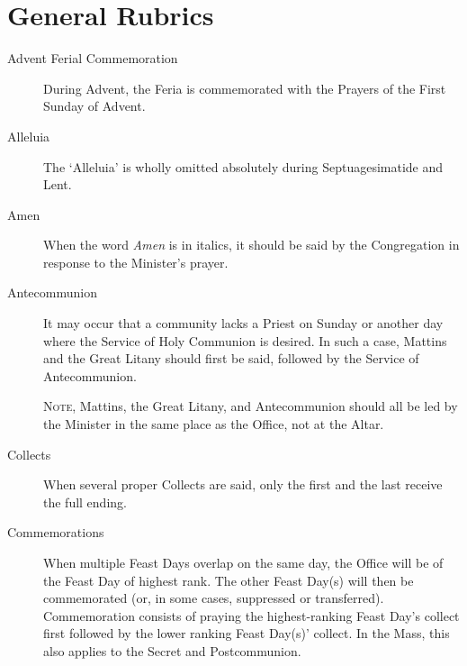\section{General Rubrics}
\begin{description}
\item[Advent Ferial Commemoration] During Advent, the Feria is commemorated with the Prayers of the First Sunday of Advent.
\item[Alleluia] The `Alleluia' is wholly omitted absolutely during Septuagesimatide and Lent.
\item[Amen] When the word \emph{Amen} is in italics, it should be said by the Congregation in response to the Minister's prayer.
\item[Antecommunion] It may occur that a community lacks a Priest on Sunday or another day where the Service of Holy Communion is desired. In such a case, Mattins and the Great Litany should first be said, followed by the Service of Antecommunion.\par
\textsc{Note,} Mattins, the Great Litany, and Antecommunion should all be led by the Minister in the same place as the Office, not at the Altar.
\item[Collects] When several proper Collects are said, only the first and the last receive the full ending.
\item[Commemorations] When multiple Feast Days overlap on the same day, the Office will be of the Feast Day of highest rank. The other Feast Day(s) will then be commemorated (or, in some cases, suppressed or transferred). Commemoration consists of praying the highest-ranking Feast Day's collect first followed by the lower ranking Feast Day(s)' collect. In the Mass, this also applies to the Secret and Postcommunion.

\end{description}
